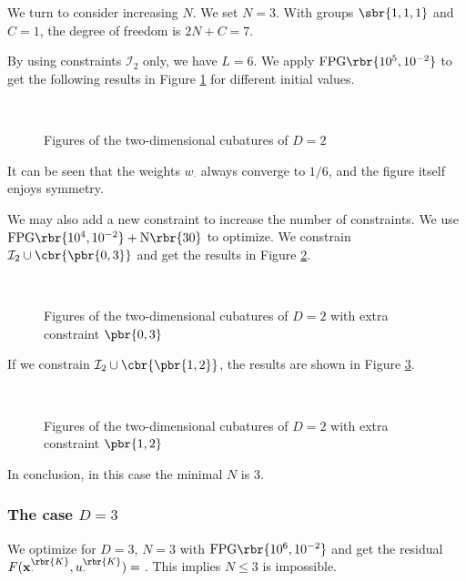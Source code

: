 \documentclass[english, nochinese]{pnote}
\begin{document}
We turn to consider increasing $N$. We set $ N = 3 $. With groups $ \sbr{ 1, 1, 1 } $ and $ C = 1 $, the degree of freedom is $ 2 N + C = 7 $.

By using constraints $\mathcal{I}_2$ only, we have $ L = 6 $. We apply $ \text{FPG} \rbr{ 10^5, 10^{-2} } $ to get the following results in Figure \ref{Fig:M2D2Ran} for different initial values.

\begin{figure}[htbp]
\centering
\scalebox{0.75}{}~
\scalebox{0.75}{}
\scalebox{0.75}{}~
\scalebox{0.75}{}
\scalebox{0.75}{}~
\scalebox{0.75}{}
\caption{Figures of the two-dimensional cubatures of $ D = 2 $}
\label{Fig:M2D2Ran}
\end{figure}

It can be seen that the weights $w_{\cdot}$ always converge to $ 1 / 6 $, and the figure itself enjoys symmetry.

We may also add a new constraint to increase the number of constraints. We use $ \text{FPG} \rbr{ 10^4, 10^{-2} } + \text{N} \rbr{30} $ to optimize. We constrain $ \mathcal{I}_2 \cup \cbr{ \pbr{ 0, 3 } } $ and get the results in Figure \ref{Fig:M2D203}.

\begin{figure}[htbp]
\centering
\scalebox{0.75}{}~
\scalebox{0.75}{}
\caption{Figures of the two-dimensional cubatures of $ D = 2 $ with extra constraint $ \pbr{ 0, 3 } $}
\label{Fig:M2D203}
\end{figure}

If we constrain $ \mathcal{I}_2 \cup \cbr{ \pbr{ 1, 2 } } $, the results are shown in Figure \ref{Fig:M2D212}.

\begin{figure}[htbp]
\centering
\scalebox{0.75}{}~
\scalebox{0.75}{}
\caption{Figures of the two-dimensional cubatures of $ D = 2 $ with extra constraint $ \pbr{ 1, 2 } $}
\label{Fig:M2D212}
\end{figure}

In conclusion, in this case the minimal $N$ is $3$.

\subsubsection{The case $ D = 3 $}

We optimize for $ D = 3 $, $ N = 3 $ with $ \text{FPG} \rbr{ 10^6, 10^{-2} } $ and get the residual $ F ( \mathbf{x}_{\cdot}^{\rbr{K}}, u_{\cdot}^{\rbr{K}} ) = \text{} $. This implies $ N \le 3 $ is impossible.
\end{document}
